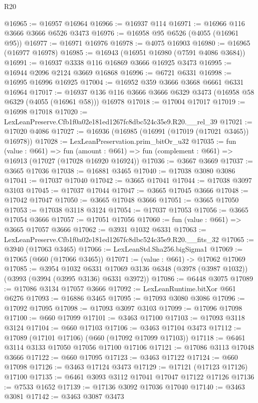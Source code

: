 \begin{lexlean}{R20}
\begin{coremodule}
@16965 := @16957 @16964
@16966 := @16937 @114
@16971 := @16966 @116 @3666 @3666 @6526 @3473
@16976 := @16958 @95 @6526 (@4055 (@16961 @95))
@16977 := @16971 @16976
@16978 := @4075 @16903
@16980 := @16965 (@16977 @16978)
@16985 := @16943 (@16951 @16980 (@7591 @4086 @3684))
@16991 := @16937 @3338 @116 @16869 @3666 @16925 @3473
@16995 := @16944 @2096 @2124 @3669 @16868
@16996 := @6721 @6331
@16998 := @16995 @16996 @16925
@17004 := @16952 @359 @3666 @3668 @6661 @6331 @16964
@17017 := @16937 @136 @116 @3666 @3666 @6329 @3473 (@16958 @58 @6329 (@4055 (@16961 @58))) @16978
@17018 := @17004 @17017
@17019 := @16998 @17018
@17020 := LexLeanPreserve.Cfb1f0a02e181ed1267fc8dbc524c35e9.R20.__rel_39
@17021 := @17020 @4086
@17027 := @16936 (@16985 (@16991 (@17019 (@17021 @3465)) @16978))
@17028 := LexLeanPreservation.prim_bitOr_u32
@17035 := fun (value : @661) =>
  fun (amount : @661) => fun (complement : @661) => @16913 (@17027 (@17028 @16920 @16924))
@17036 := @3667 @3669
@17037 := @3665 @17036
@17038 := @16881 @3465
@17040 := @17038 @3080 @3086
@17041 := @17037 @17040
@17042 := @3665 @17041
@17044 := @17038 @3097 @3103
@17045 := @17037 @17044
@17047 := @3665 @17045 @3666
@17048 := @17042 @17047
@17050 := @3665 @17048 @3666
@17051 := @3665 @17050
@17053 := @17038 @3118 @3124
@17054 := @17037 @17053
@17056 := @3665 @17054 @3666
@17057 := @17051 @17056
@17060 := fun (value : @661) => @3665 @17057 @3666
@17062 := @3931 @1032 @6331
@17063 := LexLeanPreserve.Cfb1f0a02e181ed1267fc8dbc524c35e9.R20.__fits_32
@17065 := @3940 (@17063 @3465)
@17066 := LexLeanStd.Sha256.bigSigma1
@17069 := @17065 (@660 (@17066 @3465))
@17071 := (value : @661) -> @17062 @17069
@17085 := @3954
    @1032
    @6331
    @17069
    @3136
    @6348
    (@3978 (@3987 @1032))
    (@3993 (@3994 (@3995 @3136) @6331 @3972))
@17086 := @6448 @3075
@17089 := @17086 @3134 @17057 @3666
@17092 := LexLeanRuntime.bitXor @661 @6276
@17093 := @16886 @3465
@17095 := @17093 @3080 @3086
@17096 := @17092 @17095
@17098 := @17093 @3097 @3103
@17099 := @17096 @17098
@17100 := @660 @17099
@17101 := @3463 @17100
@17103 := @17093 @3118 @3124
@17104 := @660 @17103
@17106 := @3463 @17104 @3473
@17112 := @17089 (@17101 @17106) (@660 (@17092 @17099 @17103))
@17118 := @6461 @3114 @3133 @17050 @17056 @17100 @17106
@17121 := @17086 @3113 @17048 @3666
@17122 := @660 @17095
@17123 := @3463 @17122
@17124 := @660 @17098
@17126 := @3463 @17124 @3473
@17129 := @17121 (@17123 @17126) @17100
@17135 := @6461 @3093 @3112 @17041 @17047 @17122 @17126
@17136 := @7533 @1652
@17139 := @17136 @3092 @17036 @17040
@17140 := @3463 @3081
@17142 := @3463 @3087 @3473

\end{coremodule}
\end{lexlean}
